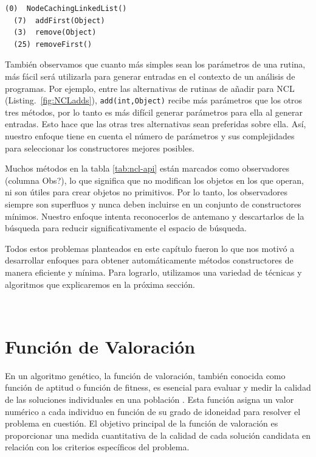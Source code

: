 \begin{lstlisting}[numbers=none,label=fig:NCLadds, caption= Conjuntos de metodos builders suficientes pero no mínimos, captionpos=b, frame=tb , basicstyle=\scriptsize]
  (0)  NodeCachingLinkedList()
  (7)  addFirst(Object)
  (3)  remove(Object)
  (25) removeFirst()
\end{lstlisting}

También observamos que cuanto más simples sean los parámetros de una rutina, más fácil será utilizarla para generar entradas en el contexto de un análisis de programas. Por ejemplo, entre las alternativas de rutinas de añadir para NCL (Listing.~\ref{fig:NCLadds}), \texttt{add(int,Object)} recibe más parámetros que los otros tres métodos, por lo tanto es más difícil generar parámetros para ella al generar entradas. Esto hace que las otras tres alternativas sean preferidas sobre ella. Así, nuestro enfoque tiene en cuenta el número de parámetros y sus complejidades para seleccionar los constructores mejores posibles.

Muchos métodos en la tabla \ref{tab:ncl-api} están marcados como observadores (columna Obs?), lo que significa que no modifican los objetos en los que operan, ni son útiles para crear objetos no primitivos. Por lo tanto, los observadores siempre son superfluos y nunca deben incluirse en un conjunto de constructores mínimos. Nuestro enfoque intenta reconocerlos de antemano y descartarlos de la búsqueda para reducir significativamente el espacio de búsqueda.

Todos estos problemas planteados en este capítulo fueron lo que nos motivó a desarrollar enfoques para obtener automáticamente métodos constructores de manera eficiente y mínima. Para lograrlo, utilizamos una variedad de técnicas y algoritmos que explicaremos en la próxima sección. 

\\


\section{Función de Valoración}
\label{sec:fitness}
En un algoritmo genético, la función de valoración, también conocida como función de aptitud o función de fitness, es esencial para evaluar y medir la calidad de las soluciones individuales en una población \cite{goldberg1989genetic}. Esta función asigna un valor numérico a cada individuo en función de su grado de idoneidad para resolver el problema en cuestión. El objetivo principal de la función de valoración es proporcionar una medida cuantitativa de la calidad de cada solución candidata en relación con los criterios específicos del problema.

